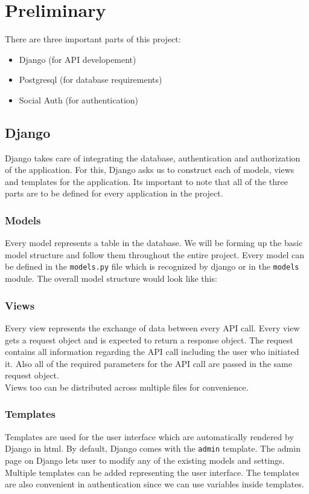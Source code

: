 \chapter{Preliminary}
There are three important parts of this project:
\begin{itemize}
    \item Django (for API developement)
    \item Postgresql (for database requirements)
    \item Social Auth (for authentication)
\end{itemize}

\section{Django}
Django takes care of integrating the database, authentication and authorization
of the application. For this, Django asks us to construct each of models, views
and templates for the application. Its important to note that all of the three
parts are to be defined for every application in the project.

\subsection{Models}
Every model represents a table in the database. We will be forming up the
basic model structure and follow them throughout the entire project.
Every model can be defined in the \texttt{models.py} file which is recognized
by django or in the \texttt{models} module. The overall model structure would
look like this:


\subsection{Views}
Every view represents the exchange of data between every API call. Every view
gets a request object and is expected to return a response object. The request
contains all information regarding the API call including the user who
initiated it. Also all of the required parameters for the API call are passed
in the same request object.\\
Views too can be distributed across multiple files for convenience.

\subsection{Templates}
Templates are used for the user interface which are automatically rendered by
Django in html. By default, Django comes with the \texttt{admin} template.
The admin page on Django lets user to modify any of the existing models and
settings. Multiple templates can be added representing the user interface.
The templates are also convenient in authentication since we can use variables
inside templates.

